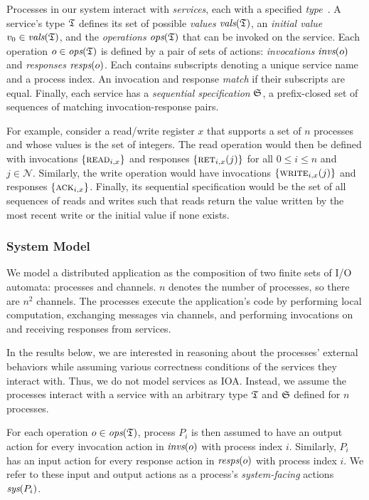 Processes in our system interact with \textit{services}, each with a specified
\textit{type}~\cite{herlihy1990linearizability,lynch1996da}. A service's type
$\mathfrak{T}$ defines its set of possible \textit{values} $\operatorname*{\textit{vals}}(\mathfrak{T})$, an
\textit{initial value} $v_0 \in \operatorname*{\textit{vals}}(\mathfrak{T})$, and the \textit{operations}
$\operatorname*{\textit{ops}}(\mathfrak{T})$ that can be invoked on the service. Each operation $o \in
\operatorname*{\textit{ops}}(\mathfrak{T})$ is defined by a pair of sets of actions: \textit{invocations} $\operatorname*{\textit{invs}}(o)$ and
\textit{responses} $\operatorname*{\textit{resps}}(o)$. Each contains subscripts denoting a unique service name and a process index. An invocation and response \textit{match} if their subscripts are equal.
Finally, each service has a \textit{sequential specification} $\mathfrak{S}$, a
prefix-closed set of sequences of matching invocation-response pairs.

For example, consider a read/write register $x$ that supports a set of $n$
processes and whose values is the set of integers. The read operation would then
be defined with invocations $\{\textsc{read}_{i,x}\}$ and responses
$\{\textsc{ret}_{i,x}(j)\}$ for all $0 \leq i \leq n$ and $j \in \mathcal{N}$.
Similarly, the write operation would have invocations
$\{\textsc{write}_{i,x}(j)\}$ and responses $\{\textsc{ack}_{i,x}\}$. Finally,
its sequential specification would be the set of all sequences of reads and
writes such that reads return the value written by the most recent write or the
initial value if none exists.

\subsubsection{System Model}
\label{sec:equivalence:preliminaries:model}

We model a distributed application as the composition of two finite sets of I/O
automata: processes and channels. $n$ denotes the number of processes, so there are $n^2$ channels. The processes execute the application's code by performing local computation, exchanging messages via channels, and performing invocations on and receiving responses from services.

In the results below, we are interested in reasoning about the processes' external behaviors while assuming various correctness conditions of the services they interact with. Thus, we do not model services as IOA. Instead, we assume the processes interact with a service with an arbitrary type $\mathfrak{T}$ and $\mathfrak{S}$ defined for $n$ processes.

For each operation $o \in \operatorname*{\textit{ops}}(\mathfrak{T})$, process $P_i$ is then assumed to have an output action for every invocation action in $\operatorname*{\textit{invs}}(o)$ with process index $i$. Similarly, $P_i$ has an input action for every response action in $\operatorname*{\textit{resps}}(o)$ with process index $i$. We refer to these input and output actions as a process's \textit{system-facing} actions $\operatorname*{\textit{sys}}(P_i)$.


